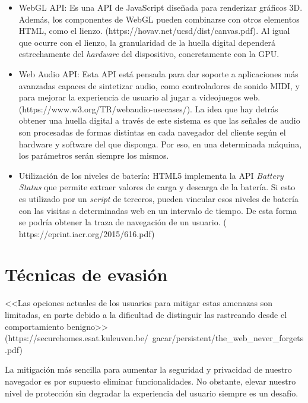 \begin{itemize}
	\item WebGL API: Es una API de JavaScript diseñada para renderizar gráficos 3D. Además, los componentes de WebGL pueden combinarse con otros elementos HTML, como el lienzo. (https://hovav.net/ucsd/dist/canvas.pdf). Al igual que ocurre con el lienzo, la granularidad de la huella digital dependerá estrechamente del \textit{hardware} del dispositivo, concretamente con la GPU.
	
	\item Web Audio API: Esta API está pensada para dar soporte a aplicaciones más avanzadas capaces de sintetizar audio, como controladores de sonido MIDI, y para mejorar la experiencia de usuario al jugar a videojuegos web. (https://www.w3.org/TR/webaudio-usecases/). La idea que hay detrás obtener una huella digital a través de este sistema es que las señales de audio son procesadas de formas distintas en cada navegador del cliente según el hardware y software del que disponga. Por eso, en una determinada máquina, los parámetros serán siempre los mismos.
	
	\item Utilización de los niveles de batería: HTML5 implementa la API \textit{Battery Status} que permite extraer valores de carga y descarga de la batería. Si esto es utilizado por un \textit{script} de terceros, pueden vincular esos niveles de batería con las visitas a determinadas web en un intervalo de tiempo. De esta forma se podría obtener la traza de navegación de un usuario. ( https://eprint.iacr.org/2015/616.pdf)
	
\end{itemize}

\section{Técnicas de evasión}
<<Las opciones actuales de los usuarios para mitigar estas amenazas son limitadas, en parte debido a la dificultad de distinguir las rastreando desde el comportamiento benigno>> (https://securehomes.esat.kuleuven.be/~gacar/persistent/the_web_never_forgets.pdf) \par 

La mitigación más sencilla para aumentar la seguridad y privacidad de nuestro navegador es por supuesto eliminar funcionalidades. No obstante, elevar nuestro nivel de protección sin degradar la experiencia del usuario siempre es un desafío. \par 

